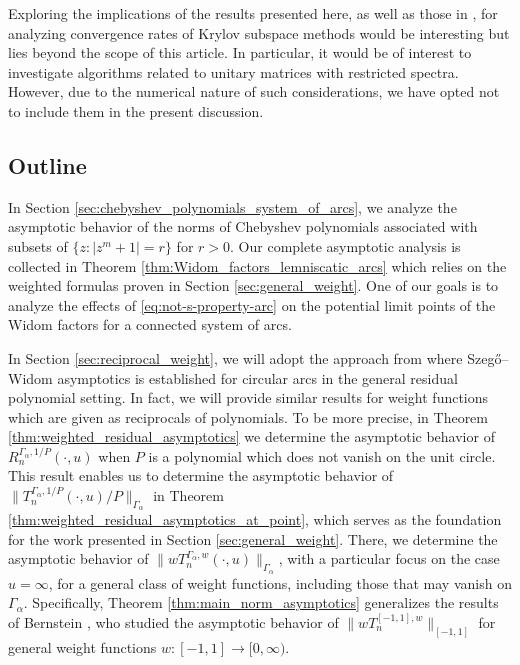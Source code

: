 \documentclass[12pt,oneside,reqno]{amsart}
\theoremstyle{definition}
\numberwithin{equation}{section}
\begin{document}
Exploring the implications of the results presented here, as well as those in \cite{eichinger17}, for analyzing convergence rates of Krylov subspace methods would be interesting but lies beyond the scope of this article. In particular, it would be of interest to investigate algorithms related to unitary matrices with restricted spectra. %
However, due to the numerical nature of such considerations, we have opted not to include them in the present discussion.

\subsection{Outline}
In Section \ref{sec:chebyshev_polynomials_system_of_arcs}, we analyze the asymptotic behavior of the norms of Chebyshev polynomials associated with subsets of $\{z:|z^m+1| = r\}$ for $r>0$. %
Our complete asymptotic analysis is collected in Theorem \ref{thm:Widom_factors_lemniscatic_arcs} which relies on the weighted formulas proven in Section \ref{sec:general_weight}. One of our goals is to analyze the effects of \eqref{eq:not-s-property-arc} on the potential limit points of the Widom factors for a connected system of arcs.


In Section \ref{sec:reciprocal_weight}, we will adopt the approach from \cite{eichinger17} where Szeg\H{o}--Widom asymptotics is established for circular arcs in the general residual polynomial setting. In fact, we will provide similar results for weight functions which are given as reciprocals of polynomials. To be more precise, in Theorem %
\ref{thm:weighted_residual_asymptotics} we determine the asymptotic behavior of 
   $R_n^{\Gamma_\alpha,1/P}(\cdot, u)$
when $P$ is a polynomial which does not vanish on the unit circle. 
This result enables us to determine the asymptotic behavior of 
   $\|T_n^{\Gamma_\alpha,1/P}(\cdot,u)/P\|_{\Gamma_\alpha}$
in Theorem \ref{thm:weighted_residual_asymptotics_at_point}, which serves as the foundation for the work presented in Section \ref{sec:general_weight}. There, we determine the asymptotic behavior of \(\|wT_n^{\Gamma_\alpha,w}(\cdot,u)\|_{\Gamma_\alpha}\), with a particular focus on the case \(u=\infty\), for a general class of weight functions, including those that may vanish on $\Gamma_\alpha$. Specifically, Theorem \ref{thm:main_norm_asymptotics} generalizes the results of Bernstein \cite{bernstein30,bernstein31}, who studied the asymptotic behavior of $\|wT_n^{[-1,1],w}\|_{[-1,1]}$ for general weight functions $w:[-1,1]\rightarrow [0,\infty)$.
\end{document}

